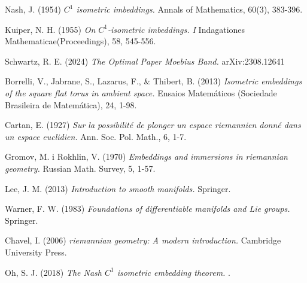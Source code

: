 \documentclass[11pt,a4paper,openright,oneside]{book}
\numberwithin{equation}{section}
\theoremstyle{definition}
\begin{document}
\newpage

\begin{thebibliography}{25}

Nash, J. (1954)
\newblock \textit{$C^1$ isometric imbeddings.}
\newblock Annals of Mathematics, 60(3), 383-396.

Kuiper, N. H. (1955)
\newblock \textit{On $C^1$-isometric imbeddings. I}
\newblock Indagationes Mathematicae(Proceedings), 58, 545-556.

Schwartz, R. E. (2024)
\newblock \textit{The Optimal Paper Moebius Band.}
\newblock arXiv:2308.12641

Borrelli, V., Jabrane, S., Lazarus, F., \& Thibert, B. (2013)
\newblock \textit{Isometric embeddings of the square flat torus in ambient space.}
\newblock Ensaios Matemáticos (Sociedade Brasileira de Matemática), 24, 1-98.

Cartan, E. (1927)
\newblock \textit{Sur la possibilité de plonger un espace riemannien donné dans un espace euclidien.}
\newblock Ann. Soc. Pol. Math., 6, 1-7.

Gromov, M. i Rokhlin, V. (1970)
\newblock \textit{Embeddings and immersions in riemannian geometry.}
\newblock Russian Math. Survey, 5, 1-57.

Lee, J. M. (2013)
\newblock \textit{Introduction to smooth manifolds.}
\newblock Springer.

Warner, F. W. (1983)
\newblock \textit{Foundations of differentiable manifolds and Lie groups.}
\newblock Springer.

Chavel, I. (2006)
\newblock \textit{riemannian geometry: A modern introduction.}
\newblock Cambridge University Press.

Oh, S. J. (2018)
\newblock \textit{The Nash $C^1$ isometric embedding theorem.}
.





\end{thebibliography}
\end{document}
